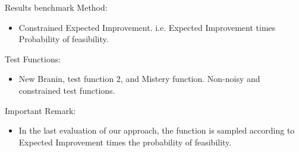 \documentclass{beamer}
\begin{document}
\begin{frame}{Results}
benchmark Method:
\begin{itemize}
	\item Constrained Expected Improvement. i.e. Expected Improvement times Probability of feasibility. 
\end{itemize}
Test Functions:
\begin{itemize}
	\item New Branin, test function 2, and Mistery function. Non-noisy and constrained test functions.
\end{itemize}

Important Remark:
\begin{itemize}
	\item In the last evaluation of our approach, the function is sampled according to Expected Improvement times the probability of feasibility.
\end{itemize}
\end{frame}
\end{document}

